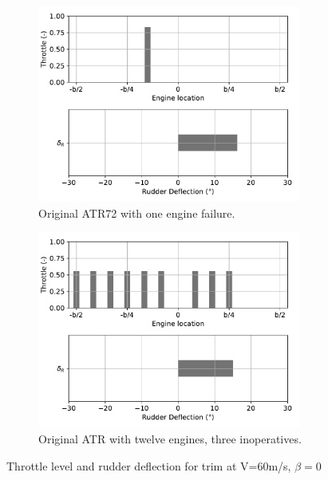\begin{figure}
	\begin{subfigure}{0.49\textwidth}
		\includegraphics[width=0.95\textwidth]{Defloriginalfin1Eng3RudFalse}
		\caption{Original ATR72 with one engine failure.}
		\label{fig:Defloriginalfin1_3engine}
	\end{subfigure}
	\begin{subfigure}{0.49\textwidth}
		\includegraphics[width=0.95\textwidth]{Defloriginalfin1Eng15RudFalse}
		\caption{Original ATR with twelve engines, three inoperatives.}
		\label{fig:Defloriginalfin1_15engine}
	\end{subfigure}
	\caption{Throttle level and rudder deflection for trim at V=60m/s, $\beta=0$}
\end{figure}

